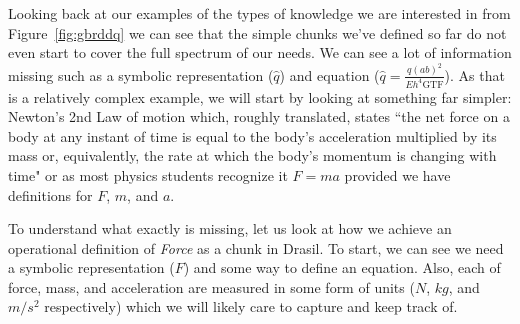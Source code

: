 
Looking back at our examples of the types of knowledge we are interested in 
from Figure~\ref{fig:gbrddq} we can see that the simple chunks we've defined so 
far do not even start to cover the full spectrum of our needs. We can see a lot 
of information missing such as a symbolic representation ($\hat{q}$) and 
equation ($\hat{q} = \frac{q(ab)^2}{Eh^4\text{GTF}}$). As that is a relatively
complex example, we will start by looking at something far simpler: Newton's 
2nd Law of motion\citep{Newton1687} which, roughly translated, states ``the net 
force on a body at any instant of time is equal to the body's acceleration 
multiplied by its mass or, equivalently, the rate at which the body's momentum 
is changing with time"  or as most physics students recognize it $F=ma$ 
provided we have definitions for $F$, $m$, and $a$.

To understand what exactly is missing, let us look at how we achieve an 
operational definition of \emph{Force} as a chunk in Drasil. To start, we can 
see we need a symbolic representation ($F$) and some way to define an equation. 
Also, each of force, mass, and acceleration are measured in some form of units 
($N$, $kg$, and $m/s^2$ respectively) which we will likely care to capture and 
keep track of. 



